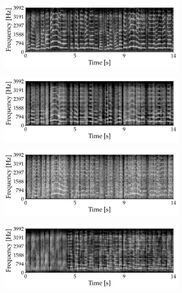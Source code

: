 \begin{figure}[t]
	\centering
	\begin{subfigure}[b]{0.48\textwidth}
		\includegraphics[width=\textwidth]{img/audioXsynth/plots/specgram_Vox}
	\end{subfigure}
	\hfil
	\begin{subfigure}[b]{0.48\textwidth}
		\includegraphics[width=\textwidth]{img/audioXsynth/plots/specgram_406_P_ENV}
	\end{subfigure}
	\hfil
	\begin{subfigure}[b]{0.48\textwidth}
		\includegraphics[width=\textwidth]{img/audioXsynth/plots/specgram_mfcc-knn}
	\end{subfigure}
	\hfil
	\begin{subfigure}[b]{0.48\textwidth}
		\includegraphics[width=\textwidth]{img/audioXsynth/plots/specgram_flatten}
	\end{subfigure}
	

\end{figure}
